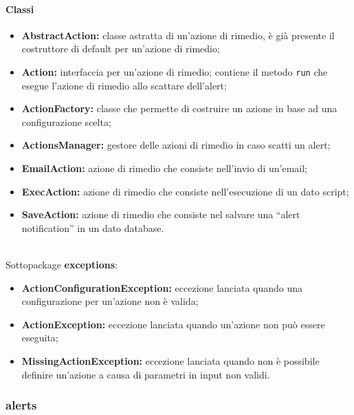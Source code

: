 		\paragraph*{Classi}
			\begin{itemize}
				\item \textbf{AbstractAction:} classe astratta di un'azione di rimedio, è già 
					presente il costruttore di default per un'azione di rimedio;
				\item \textbf{Action:} interfaccia per un'azione di rimedio; contiene il metodo \verb=run=
					che esegue l'azione di rimedio allo scattare dell'alert;
				\item \textbf{ActionFactory:} classe che permette di 
					costruire un azione in base ad una configurazione scelta;
				\item \textbf{ActionsManager:} gestore delle azioni di rimedio in caso scatti un alert;
				\item \textbf{EmailAction:} azione di rimedio che consiste nell'invio di un'email;
				\item \textbf{ExecAction:} azione di rimedio che consiste nell'esecuzione di un dato script;
				\item \textbf{SaveAction:} azione di rimedio che consiste nel salvare una ``alert notification''
					in un dato database.
			\end{itemize}\\
			
			Sottopackage \textbf{exceptions}:
			\begin{itemize}
				\item \textbf{ActionConfigurationException:} eccezione lanciata quando una configurazione
					per un'azione non è valida;
				\item \textbf{ActionException:} eccezione lanciata quando un'azione non può essere eseguita;
				\item \textbf{MissingActionException:} eccezione lanciata quando non è possibile definire 
					un'azione a causa di parametri in input non validi.
			\end{itemize}

\newpage

	\subsubsection{alerts}
	

